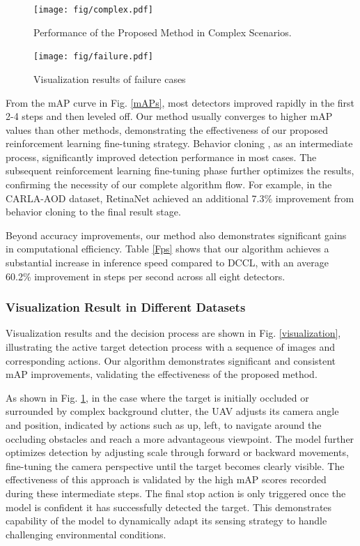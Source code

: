 \documentclass[lettersize,journal]{IEEEtran}
\begin{document}
\begin{figure}[!t]
    \centering
    \texttt{[image: fig/complex.pdf]}
    \caption{Performance of the Proposed Method in Complex Scenarios.}
    \label{complex}
\end{figure}

\begin{figure}[!t]
    \centering
    \texttt{[image: fig/failure.pdf]}
    \caption{Visualization results of failure cases}
    \label{failure}
\end{figure}


From the mAP curve in Fig. \ref{mAPs}, most detectors improved rapidly in the first 2-4 steps and then leveled off. Our method usually converges to higher mAP values than other methods, demonstrating the effectiveness of our proposed reinforcement learning fine-tuning strategy.
Behavior cloning , as an intermediate process, significantly improved detection performance in most cases. The subsequent reinforcement learning fine-tuning phase further optimizes the results, confirming the necessity of our complete algorithm flow. For example, in the CARLA-AOD dataset, RetinaNet achieved an additional 7.3\% improvement from behavior cloning to the final result stage.  

Beyond accuracy improvements, our method also demonstrates significant gains in computational efficiency. Table \ref{Fps} shows that our algorithm achieves a substantial increase in inference speed compared to DCCL, with an average 60.2\% improvement in steps per second across all eight detectors.



\subsubsection{Visualization Result in Different Datasets}
Visualization results and the decision process are shown in Fig. \ref{visualization}, illustrating the active target detection process with a sequence of images and corresponding actions. Our algorithm demonstrates significant and consistent mAP improvements, validating the effectiveness of the proposed method.

As shown in Fig. \ref{complex}, in the case where the target is initially occluded or surrounded by complex background clutter, the UAV adjusts its camera angle and position, indicated by actions such as up, left, to navigate around the occluding obstacles and reach a more advantageous viewpoint. The model further optimizes detection by adjusting scale through forward or backward movements, fine-tuning the camera perspective until the target becomes clearly visible. The effectiveness of this approach is validated by the high mAP scores recorded during these intermediate steps.
The final stop action is only triggered once the model is confident it has successfully detected the target. This demonstrates capability of the model to dynamically adapt its sensing strategy to handle challenging environmental conditions.
\end{document}
